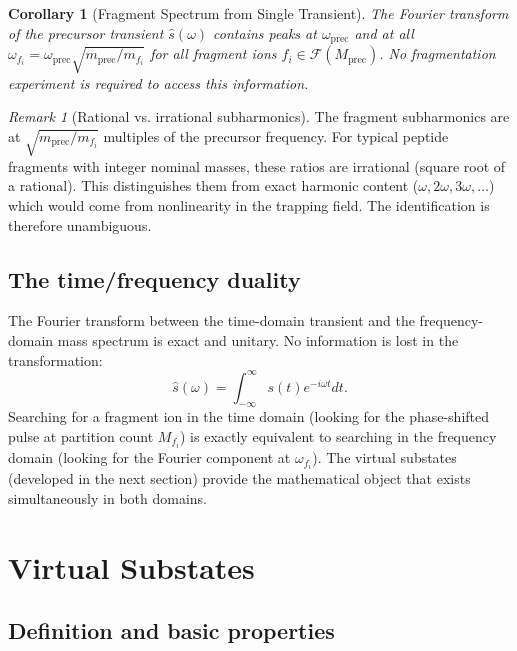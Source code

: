 \documentclass[twocolumn,10pt,a4paper]{article}
\theoremstyle{thmstyle}
\newtheorem{corollary}[theorem]{Corollary}
\theoremstyle{definition}
\theoremstyle{remark}
\newtheorem{remark}[theorem]{Remark}
\newcommand{\calF}{\mathcal{F}}
\begin{document}
\begin{corollary}[Fragment Spectrum from Single Transient]
\label{cor:singleMS}
The Fourier transform of the precursor transient $\hat{s}(\omega)$
contains peaks at $\omega_{\text{prec}}$ and at all
$\omega_{f_i} = \omega_{\text{prec}}\sqrt{m_{\text{prec}}/m_{f_i}}$
for all fragment ions $f_i \in \calF(M_{\text{prec}})$.
No fragmentation experiment is required to access this information.
\end{corollary}

\begin{remark}[Rational vs. irrational subharmonics]
The fragment subharmonics are at $\sqrt{m_{\text{prec}}/m_{f_i}}$
multiples of the precursor frequency. For typical peptide fragments
with integer nominal masses, these ratios are irrational (square root
of a rational). This distinguishes them from exact harmonic content
($\omega, 2\omega, 3\omega, \ldots$) which would come from nonlinearity
in the trapping field. The identification is therefore unambiguous.
\end{remark}

\subsection{The time/frequency duality}

The Fourier transform between the time-domain transient and the
frequency-domain mass spectrum is exact and unitary. No information
is lost in the transformation:
\begin{equation}
\hat{s}(\omega) = \int_{-\infty}^{\infty} s(t) e^{-i\omega t} dt.
\label{eq:fourier}
\end{equation}
Searching for a fragment ion in the time domain (looking for the
phase-shifted pulse at partition count $M_{f_i}$) is exactly equivalent
to searching in the frequency domain (looking for the Fourier component
at $\omega_{f_i}$). The virtual substates (developed in the next section)
provide the mathematical object that exists simultaneously in both
domains.

\section{Virtual Substates}
\label{sec:virtual}

\subsection{Definition and basic properties}
\end{document}
